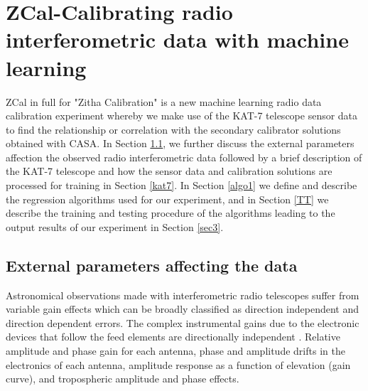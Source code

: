 \chapter{ZCal-Calibrating radio interferometric data with machine learning}
\label{c3}
ZCal in full for "Zitha Calibration" is a new machine learning radio data calibration experiment whereby we make use of the KAT-7 telescope sensor data to find the relationship or correlation with the secondary calibrator solutions obtained with CASA. In Section \ref{Exp}, we further discuss the external parameters affection the observed radio interferometric data followed by a brief description of the KAT-7 telescope and how the sensor data  and calibration solutions are processed for training in  Section \ref{kat7}. In Section \ref{algo1} we define and describe the regression algorithms used for our experiment, and in Section \ref{TT} we describe the training and testing procedure of the algorithms leading to the output results of our experiment in Section \ref{sec3}. 
\section{External parameters affecting the data}
\label{Exp}

Astronomical observations made with interferometric radio
telescopes suffer from variable gain effects which can be
broadly classified as direction independent and direction dependent errors. The complex instrumental gains due to the electronic devices that follow the feed elements are directionally independent \citep{bhatnagar2008correcting}. Relative amplitude and phase gain for each antenna, phase and amplitude drifts in the electronics of each antenna, amplitude response as a function of elevation (gain curve), and tropospheric amplitude and phase effects.

